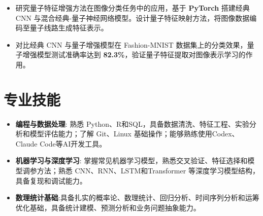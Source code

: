\documentclass{resume}
\begin{document}
\begin{itemize}
  \item 研究量子特征增强方法在图像分类任务中的应用，基于 \textbf{PyTorch} 搭建经典 CNN 与混合经典-量子神经网络模型。设计量子特征映射方法，将图像数据编码至量子线路生成特征表示。
  \item 对比经典 CNN 与量子增强模型在 Fashion-MNIST 数据集上的分类效果，量子增强模型测试准确率达到 \textbf{82.3\%}，验证量子特征提取对图像表示学习的作用。
  
\end{itemize}

\section{专业技能}
\begin{itemize}[parsep=0.2ex]
  \item \textbf{编程与数据处理}: 熟悉 Python、R和SQL，具备数据清洗、特征工程、实验分析和模型评估能力；了解 Git、Linux 基础操作；能够熟练使用Codex、Claude Code等AI开发工具。
  \item \textbf{机器学习与深度学习}: 掌握常见机器学习模型，熟悉交叉验证、特征选择和模型调参方法；熟悉 CNN、RNN、LSTM和Transformer 等深度学习模型结构，具备复现和调试能力。

  \item \textbf{数理统计基础}:具备扎实的概率论、数理统计、回归分析、时间序列分析和运筹优化基础，具备统计建模、预测分析和业务问题抽象能力。
\end{itemize}





%
%
\endgroup
\vspace*{\fill}
\end{document}
